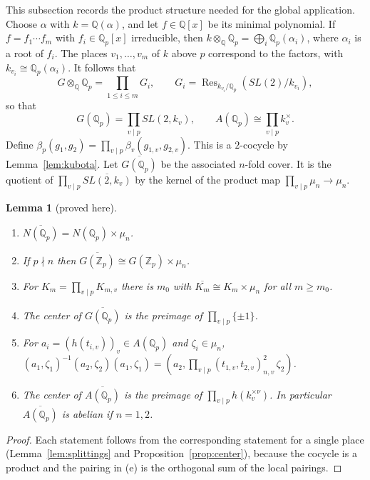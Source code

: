 \documentclass[12pt,letterpaper]{article}
\numberwithin{equation}{section}
\newtheorem{lemma}[theorem]{Lemma}
\theoremstyle{definition}
\newcommand{\proved}{proved here}
\newcommand{\Z}{\mathbb Z}
\newcommand{\Q}{\mathbb Q}
\DeclareMathOperator{\Res}{Res}
\begin{document}
This subsection records the product structure needed for the global application.  Choose
$\alpha$ with $k=\Q(\alpha)$, and let $f\in\Q[x]$ be its minimal polynomial.  If
$f=f_1\cdots f_m$ with $f_i\in\Q_p[x]$ irreducible, then
$k\otimes_{\Q}\Q_p=\bigoplus_{i}\Q_p(\alpha_i)$, where $\alpha_i$ is a root of $f_i$.  The
places $v_1,\dots,v_m$ of $k$ above $p$ correspond to the factors, with
$k_{v_i}\cong\Q_p(\alpha_i)$.  It follows that
\begin{equation}\label{eq:GQp}
G\otimes_{\Q}\Q_p=\prod_{1\le i\le m}G_i,\qquad G_i=\Res_{k_{v_i}/\Q_p}(SL(2)/k_{v_i}),
\end{equation}
so that
\begin{equation}\label{eq:AQp}
G(\Q_p)=\prod_{v\mid p}SL(2,k_v),\qquad A(\Q_p)\cong\prod_{v\mid p}k_v^\times .
\end{equation}
Define $\beta_p(g_1,g_2)=\prod_{v\mid p}\beta_v(g_{1,v},g_{2,v})$.  This is a $2$-cocycle by
Lemma~\ref{lem:kubota}.  Let $\overline{G(\Q_p)}$ be the associated $n$-fold cover.  It is
the quotient of $\prod_{v\mid p}\overline{SL(2,k_v)}$ by the kernel of the product map
$\prod_{v\mid p}\mu_n\to\mu_n$.

\begin{lemma}[\proved]\label{lem:Qp}
\begin{enumerate}[label=(\alph*),leftmargin=*,itemsep=1pt]
\item $\overline{N(\Q_p)}=N(\Q_p)\times\mu_n$.
\item If $p\nmid n$ then $\overline{G(\Z_p)}\cong G(\Z_p)\times\mu_n$.
\item For $K_m=\prod_{v\mid p}K_{m,v}$ there is $m_0$ with
$\overline{K_m}\cong K_m\times\mu_n$ for all $m\ge m_0$.
\item The center of $\overline{G(\Q_p)}$ is the preimage of $\prod_{v\mid p}\{\pm1\}$.
\item For $a_i=(h(t_{i,v}))_v\in A(\Q_p)$ and $\zeta_i\in\mu_n$,
$(a_1,\zeta_1)^{-1}(a_2,\zeta_2)(a_1,\zeta_1)=(a_2,\prod_{v\mid p}(t_{1,v},t_{2,v})_{n,v}^{2}\,\zeta_2)$.
\item The center of $\overline{A(\Q_p)}$ is the preimage of
$\prod_{v\mid p}h(k_v^{\times\nu})$.  In particular $\overline{A(\Q_p)}$ is abelian if
$n=1,2$.
\end{enumerate}
\end{lemma}
\begin{proof}
Each statement follows from the corresponding statement for a single place
(Lemma~\ref{lem:splittings} and Proposition~\ref{prop:center}), because the cocycle is a
product and the pairing in (e) is the orthogonal sum of the local pairings.
\end{proof}
\end{document}

